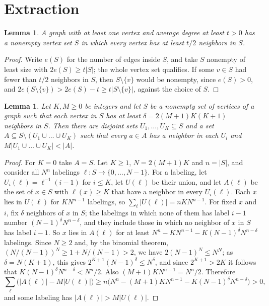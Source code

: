 \documentclass[11pt]{article}
\newtheorem{lemma}[theorem]{Lemma}
\theoremstyle{remark}
\begin{document}
\section{Extraction}\label{sec:extract}

\begin{lemma}\label{lem:mindeg}
A graph with at least one vertex and average degree at least $t>0$ has a
nonempty vertex set $S$ in which every vertex has at least $t/2$ neighbors
in $S$.
\end{lemma}

\begin{proof}
Write $e(S)$ for the number of edges inside $S$, and take $S$ nonempty of
least size with $2e(S)\ge t|S|$; the whole vertex set qualifies. If some
$v\in S$ had fewer than $t/2$ neighbors in $S$, then $S\setminus\{v\}$
would be nonempty, since $e(S)>0$, and
$2e(S\setminus\{v\})>2e(S)-t\ge t|S\setminus\{v\}|$, against the choice
of $S$.
\end{proof}

\begin{lemma}\label{lem:extract}
Let $K,M\ge0$ be integers and let $S$ be a nonempty set of vertices of a
graph such that each vertex in $S$ has at least $\delta=2(M+1)K(K+1)$
neighbors in $S$.
Then there are disjoint sets $U_1,\dots,U_K\subseteq S$ and a set
$A\subseteq S\setminus(U_1\cup\dots\cup U_K)$ such that every $a\in A$ has
a neighbor in each $U_i$ and $M|U_1\cup\dots\cup U_K|<|A|$.
\end{lemma}

\begin{proof}
For $K=0$ take $A=S$. Let $K\ge1$, $N=2(M+1)K$ and $n=|S|$, and consider
all $N^n$ labelings $\ell\colon S\to\{0,\dots,N-1\}$. For a labeling, let
$U_i(\ell)=\ell^{-1}(i-1)$ for $i\le K$, let $U(\ell)$ be their union, and
let $A(\ell)$ be the set of $x\in S$ with $\ell(x)\ge K$ that have a
neighbor in every $U_i(\ell)$. Each $x$ lies in $U(\ell)$ for $KN^{n-1}$
labelings, so $\sum_\ell|U(\ell)|=nKN^{n-1}$. For fixed $x$ and $i$, fix
$\delta$ neighbors of $x$ in $S$; the labelings in which none of them has
label $i-1$ number $(N-1)^\delta N^{n-\delta}$, and they include those in
which no neighbor of $x$ in $S$ has label $i-1$. So $x$ lies in $A(\ell)$ for at least
$N^n-KN^{n-1}-K(N-1)^\delta N^{n-\delta}$ labelings. Since $N\ge2$ and,
by the binomial theorem, $(N/(N-1))^N\ge1+N/(N-1)>2$, we have
$2(N-1)^N\le N^N$; as $\delta=N(K+1)$, this gives
$2^{K+1}(N-1)^\delta\le N^\delta$, and since $2^{K+1}>2K$ it follows that
$K(N-1)^\delta N^{n-\delta}<N^n/2$. Also $(M+1)KN^{n-1}=N^n/2$. Therefore
\[
\sum_\ell\bigl(|A(\ell)|-M|U(\ell)|\bigr)\ge
n\bigl(N^n-(M+1)KN^{n-1}-K(N-1)^\delta N^{n-\delta}\bigr)>0,
\]
and some labeling has $|A(\ell)|>M|U(\ell)|$.
\end{proof}
\end{document}
